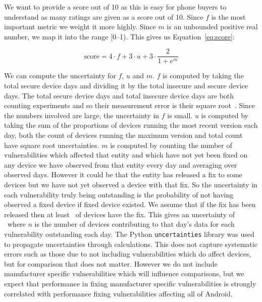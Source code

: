 We want to provide a score out of 10 as this is easy for phone buyers to understand as many ratings are given as a score out of 10.
Since $f$ is the most important metric we weight it more highly.
Since $m$ is an unbounded positive real number, we map it into the range [0--1).
This gives us Equation~\ref{eq:score}:

\begin{equation}
\mathrm{score} = 4 \cdot f + 3 \cdot u + 3 \cdot \frac{2}{1+e^m} \label{eq:score}
\end{equation}

We can compute the uncertainty for $f$, $u$ and $m$.
$f$ is computed by taking the total secure device days and dividing it by the total insecure and secure device days.
The total secure device days and total insecure device days are both counting experiments and so their measurement error is their square root~\cite{Taylor1997}.
Since the numbers involved are large, the uncertainty in $f$ is small.
$u$ is computed by taking the sum of the proportions of devices running the most recent version each day, both the count of devices running the maximum version and total count have square root uncertainties.
$m$ is computed by counting the number of vulnerabilities which affected that entity and which have not yet been fixed on any device we have observed from that entity every day and averaging over observed days.
However it could be that the entity has released a fix to some devices but we have not yet observed a device with that fix.
So the uncertainty in each vulnerability truly being outstanding is the probability of not having observed a fixed device if fixed device existed.
We assume that if the fix has been released then at least \daMeanOutstandingProbability\ of devices have the fix.
This gives an uncertainty of \daMeanOutstandingUncertaintyEquation\ where $n$ is the number of devices contributing to that day's data for each vulnerability outstanding each day.
The Python \texttt{uncertainties} library was used to propagate uncertainties through calculations.
This does not capture systematic errors such as those due to not including vulnerabilities which do affect devices, but for comparison that does not matter.
However we do not include manufacturer specific vulnerabilities which will influence comparisons, but we expect that performance in fixing manufacturer specific vulnerabilities is strongly correlated with performance fixing vulnerabilities affecting all of Android.


